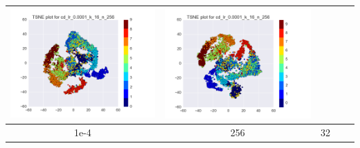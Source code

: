 \documentclass[12pt]{report}
\begin{document}
\begin{table}[H]
\begin{tabular}{ | c | c | c | c || c |}
\begin{minipage}{.3\textwidth}
      \includegraphics[scale=0.25]{cd_lr_0_0001_k_16_n_256.png}
    \end{minipage} &
    \begin{minipage}{.3\textwidth}
      \includegraphics[scale=0.25]{test_cd_lr_0_0001_k_16_n_256.png}
    \end{minipage}
        \\ \hline
    1e-4 & 256 & 32 &
    \begin{minipage}{.3\textwidth}

\end{minipage}
\end{tabular}
\end{table}
\end{document}
